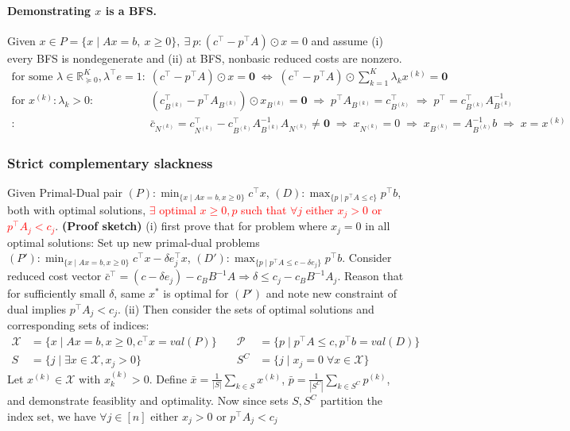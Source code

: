\documentclass{article}
\begin{document}
\paragraph{Demonstrating $x$ is a BFS.} Given $x\in P=\{x\mid Ax=b,\ x\geq 0\},\ \exists\ p: (c^\top - p^\top A)\odot x = 0$ and assume (i) every BFS is nondegenerate and (ii) at BFS, nonbasic reduced costs are nonzero. 
{\footnotesize
\begin{align*}
    \text{for some } \lambda\in\mathbb R_{\succeq0}^K, \lambda^\top e = 1:\quad&
        \left(c^\top - p^\top A\right) \odot x = \mathbf{0}
        \;\iff\; (c^\top - p^\top A) \odot\sum_{k=1}^K \lambda_k x^{(k)}  = \mathbf{0} \\
    \text{for $x^{(k)}:\lambda_k >0$}:\quad&
        \left(c^\top_{B^{(k)}} - p^\top A_{B^{(k)}}\right) \odot x_{B^{(k)}} = \mathbf{0} 
        \;\Longrightarrow\; p^\top A_{B^{(k)}} = c_{B^{(k)}}^\top
        \;\Longrightarrow\; p^\top = c_{B^{(k)}}^\top A_{B^{(k)}}^{-1}\\
    :\quad& \bar c_{N^{(k)}} = c^\top_{N^{(k)}} - c_{B^{(k)}}^\top A_{B^{(k)}}^{-1}A_{N^{(k)}} \neq \mathbf{0} \;\Longrightarrow\; x_{N^{(k)}} = 0 \;\Longrightarrow\; x_{B^{(k)}} = A_{B^{(k)}}^{-1}b \;\Longrightarrow\; x = x^{(k)}
\end{align*} 
}

\subsubsection{Strict complementary slackness}
Given Primal-Dual pair $(P): \min_{\{x \mid Ax = b, x \geq 0\}} c^\top x$, $(D): \max_{\{p \mid p^\top A \leq c\}} p^\top b$, both with optimal solutions, \textcolor{red}{$\exists$ optimal $x\geq 0, p$ such that $\forall j$ either $x_j > 0$ or $p^\top A_j < c_j$}. \textbf{(Proof sketch)} (i) first prove that for problem where $x_j = 0$ in all optimal solutions: Set up new primal-dual problems $(P'): \min_{\{x \mid Ax = b, x \geq 0\}} c^\top x - \delta e_j^\top x$, $(D'): \max_{\{p \mid p^\top A \leq c - \delta e_j\}} p^\top b$. Consider reduced cost vector $\bar c^\top  = (c - \delta e_j) - c_BB^{-1}A \Longrightarrow \delta \leq  c_j - c_BB^{-1}A_j$. Reason that for sufficiently small $\delta$, same $x^*$ is optimal for $(P')$ and note new constraint of dual implies $p^\top A_j < c_j$. (ii) Then consider the sets of optimal solutions and corresponding sets of indices: 
\begin{align*}
  \mathcal X &= \{x \mid Ax = b, x\geq 0, c^\top x = val(P)\} &\quad \mathcal P &= \{p \mid p^\top A \leq c, p^\top b = val(D)\}\\
  S &= \{j \mid \exists x \in \mathcal X, x_j > 0\} &\quad S^C &= \{j \mid x_j = 0 \;\forall x \in \mathcal X\}
\end{align*}
Let $x^{(k)}\in \mathcal X$ with $x^{(k)}_k > 0$. Define $\bar x = \frac{1}{|S|} \sum_{k \in S} x^{(k)}$, $\bar p = \frac{1}{|S^C|} \sum_{k \in S^C} p^{(k)}$, and demonstrate feasiblity and optimality. Now since sets $S, S^C$ partition the index set, we have $\forall j \in [n]$ either $x_j > 0$ or $p^\top A_j < c_j$
\end{document}
